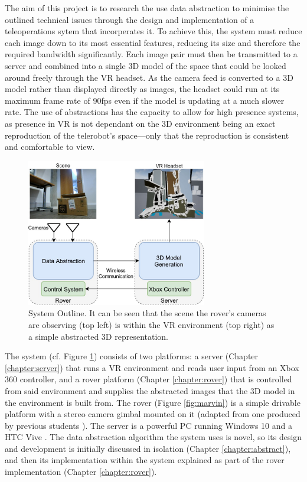 The aim of this project is to research the use data abstraction to minimise the outlined technical issues through the design and implementation of a teleoperations sytem that incorperates it. To achieve this, the system must reduce each image down to its most essential features, reducing its size and therefore the required bandwidth significantly. Each image pair must then be transmitted to a server and combined into a single 3D model of the space that could be looked around freely through the VR headset. As the camera feed is converted to a 3D model rather than displayed directly as images, the headset could run at its maximum frame rate of 90fps even if the model is updating at a much slower rate. The use of abstractions has the capacity to allow for high presence systems, as presence in VR is not dependant on the 3D environment being an exact reproduction of the telerobot's space---only that the reproduction is consistent and comfortable to view. 

\begin{figure}[H]
    \begin{center}
      \includegraphics[width=0.7\textwidth]{Figures/Outline.jpg}
      \caption[System Outline]{System Outline. It can be seen that the scene the rover's cameras are observing (top left) is within the VR environment (top right) as a simple abstracted 3D representation.}
      \label{fig:outline}
    \end{center}
\end{figure}

The system (cf. Figure \ref{fig:outline}) consists of two platforms: a server (Chapter \ref{chapter:server}) that runs a VR environment and reads user input from an Xbox 360 controller, and a rover platform (Chapter \ref{chapter:rover}) that is controlled from said environment and supplies the abstracted images that the 3D model in the environment is built from. The rover (Figure \ref{fig:marvin}) is a simple drivable platform with a stereo camera gimbal mounted on it (adapted from one produced by previous students \cite{gimble}). The server is a powerful PC running Windows 10 \cite{windows} and a HTC Vive \cite{Vive}. The data abstraction algorithm the system uses is novel, so its design and development is initially discussed in isolation (Chapter \ref{chapter:abstract}), and then its implementation within the system explained as part of the rover implementation (Chapter \ref{chapter:rover}).


